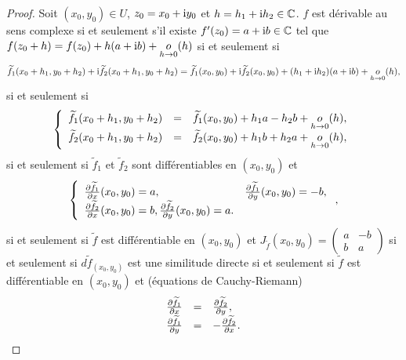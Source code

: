 \documentclass[12pt]{article}
\begin{document}
\begin{proof}
	Soit $(x_0,y_0)\in U$, $z_0=x_0+\mathrm{i} y_0$ et $h=h_1+\mathrm{i} h_2\in\mathbb{C}$. $f$ est dérivable au sens complexe si et seulement s'il existe $f'(z_0)=a+\mathrm{i} b\in\mathbb{C}$ tel que $f(z_0+h)=f(z_0)+h(a+\mathrm{i} b)+\underset{h\to0}{o}(h)$ si et seulement si 
	\begin{equation}
		\widetilde{f}_1(x_0+h_1,y_0+h_2)+\mathrm{i}\widetilde{f}_2(x_0+h_1,y_0+h_2)=\widetilde{f}_1	(x_0,y_0)+\mathrm{i}\widetilde{f}_2(x_0,y_0)+(h_1+\mathrm{i} h_2)(a+\mathrm{i} b)+\underset{h\to0}{o}(h),
	\end{equation}
	si et seulement si 
	\begin{equation}
		\left\lbrace
			\begin{array}[]{rcl}
				\widetilde{f}_1(x_0+h_1,y_0+h_2) &=&\widetilde{f}_1(x_0,y_0)+h_1a-h_2b+\underset{h\to0}{o}(h),\\
				\widetilde{f}_2(x_0+h_1,y_0+h_2) &=&\widetilde{f}_2(x_0,y_0)+h_1b+h_2a+\underset{h\to0}{o}(h),
			\end{array}
		\right.
	\end{equation}
	si et seulement si $\widetilde{f}_1$ et $\widetilde{f}_2$ sont différentiables en $(x_0,y_0)$ et 
	\begin{equation}
		\left\lbrace
			\begin{array}[]{ll}
				\frac{\partial \widetilde{f}_1}{\partial x}(x_0,y_0)=a, &\frac{\partial \widetilde{f}_1}{\partial y}(x_0,y_0)=-b,\\
				\frac{\partial \widetilde{f}_2}{\partial x}(x_0,y_0)=b, \frac{\partial \widetilde{f}_2}{\partial y}(x_0,y_0) =a.
			\end{array}
		\right.,
	\end{equation}
	si et seulement si $\widetilde{f}$ est différentiable en $(x_0,y_0)$ et $J_{\widetilde{f}}(x_0,y_0)=\begin{pmatrix}
		a&-b\\b&a
	\end{pmatrix}$ si et seulement si $d\widetilde{f}_{(x_0,y_0)}$ est une similitude directe si et seulement si $\widetilde{f}$ est différentiable en $(x_0,y_0)$ et (équations de Cauchy-Riemann)
	\begin{equation}
		\begin{array}[]{rcl}
			\frac{\partial \widetilde{f}_1}{\partial x} &=& \frac{\partial \widetilde{f}_2}{\partial y},\\
			\frac{\partial \widetilde{f}_1}{\partial y} &=& -\frac{\partial \widetilde{f}_2}{\partial x}.
		\end{array}
	\end{equation}
\end{proof}
\end{document}

